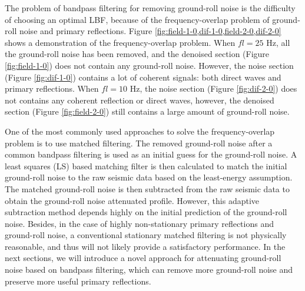 The problem of bandpass filtering for removing ground-roll noise is the difficulty of choosing an optimal LBF, because of the frequency-overlap problem of ground-roll noise and primary reflections. Figure \ref{fig:field-1-0,dif-1-0,field-2-0,dif-2-0} shows a demonstration of the frequency-overlap problem. When $fl=25$ Hz, all the ground-roll noise has been removed, and the denoised section (Figure \ref{fig:field-1-0}) does not contain any ground-roll noise. However, the noise section (Figure \ref{fig:dif-1-0}) contains a lot of coherent signals: both direct waves and primary reflections. When $fl=10$ Hz, the noise section (Figure \ref{fig:dif-2-0}) does not contains any coherent reflection or direct waves, however, the denoised section (Figure \ref{fig:field-2-0}) still contains a large amount of ground-roll noise. 

One of the most commonly used approaches to solve the frequency-overlap problem is to use matched filtering. The removed ground-roll noise after a common bandpass filtering is used as an initial guess for the ground-roll noise. A least squares (LS) based matching filter is then calculated to match the initial ground-roll noise to the raw seismic data based on the least-energy assumption. The matched ground-roll noise is then subtracted from the raw seismic data to obtain the ground-roll noise attenuated profile. However, this adaptive subtraction method depends highly on the initial prediction of the ground-roll noise. Besides, in the case of highly non-stationary primary reflections and ground-roll noise, a conventional stationary matched filtering is not physically reasonable, and thus will not likely provide a satisfactory performance. In the next sections, we will introduce a novel approach for attenuating ground-roll noise based on bandpass filtering, which can remove more ground-roll noise and preserve more useful primary reflections.

